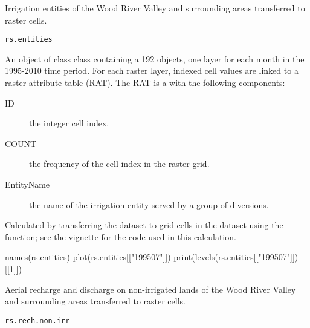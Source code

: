 \documentclass[a4paper]{book}
\begin{document}
%
\begin{Description}\relax
Irrigation entities of the Wood River Valley and surrounding areas transferred to raster cells.
\end{Description}
%
\begin{Usage}
\begin{verbatim}
rs.entities
\end{verbatim}
\end{Usage}
%
\begin{Format}
An object of class  class containing a 192  objects, one layer for each month in the 1995-2010 time period.
For each raster layer, indexed cell values are linked to a raster attribute table (RAT).
The RAT is a  with the following components:
\begin{description}

\item[ID] the integer cell index.
\item[COUNT] the frequency of the cell index in the raster grid.
\item[EntityName] the name of the irrigation entity served by a group of diversions.

\end{description}

\end{Format}
%
\begin{Source}\relax
Calculated by transferring the  dataset to grid cells in the  dataset using the  function;
see the  vignette for the \R{} code used in this calculation.
\end{Source}
%
\begin{Examples}
\begin{ExampleCode}
names(rs.entities)
plot(rs.entities[["199507"]])
print(levels(rs.entities[["199507"]])[[1]])
\end{ExampleCode}
\end{Examples}
%
\begin{Description}\relax
Aerial recharge and discharge on non-irrigated lands of the Wood River Valley and surrounding areas transferred to raster cells.
\end{Description}
%
\begin{Usage}
\begin{verbatim}
rs.rech.non.irr
\end{verbatim}
\end{Usage}
\end{document}
